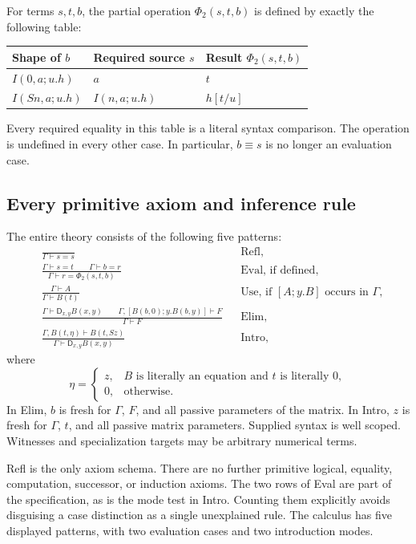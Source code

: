\documentclass[11pt]{article}
\theoremstyle{definition}\newtheorem{definition}[theorem]{Definition}
\newcommand{\D}{\mathsf D}
\begin{document}
For terms $s,t,b$, the partial operation $\Phi_2(s,t,b)$ is defined
by exactly the following table:
\begin{center}
\begin{tabular}{@{}lll@{}}
\toprule
Shape of $b$ & Required source $s$ & Result $\Phi_2(s,t,b)$\\
\midrule
$I(0,a;u.h)$ & $a$ & $t$\\
$I(Sn,a;u.h)$ & $I(n,a;u.h)$ & $h[t/u]$\\
\bottomrule
\end{tabular}
\end{center}
Every required equality in this table is a literal syntax comparison.
The operation is undefined in every other case. In particular,
$b\equiv s$ is no longer an evaluation case.

\subsection{Every primitive axiom and inference rule}

The entire theory consists of the following five patterns:
\begin{align}
 &\frac{}{\Gamma\vdash s=s}
       &&\text{Refl},\label{rule:refl}\\[3pt]
 &\frac{\Gamma\vdash s=t\qquad\Gamma\vdash b=r}
        {\Gamma\vdash r=\Phi_2(s,t,b)}
       &&\text{Eval, if defined},\label{rule:eval}\\[3pt]
 &\frac{\Gamma\vdash A}{\Gamma\vdash B(t)}
       &&\text{Use, if }[A;y.B]\text{ occurs in }\Gamma,\label{rule:use}\\[3pt]
 &\frac{\Gamma\vdash\D_{x,y}B(x,y)\qquad
         \Gamma,[B(b,0);y.B(b,y)]\vdash F}
        {\Gamma\vdash F}
       &&\text{Elim},\label{rule:elim}\\[3pt]
 &\frac{\Gamma,B(t,\eta)\vdash B(t,Sz)}
        {\Gamma\vdash\D_{x,y}B(x,y)}
       &&\text{Intro},\label{rule:intro}
\end{align}
where
\[
 \eta=\begin{cases}
 z,&\text{$B$ is literally an equation and $t$ is literally $0$},\\
 0,&\text{otherwise}.
 \end{cases}
\]
In Elim, $b$ is fresh for $\Gamma$, $F$, and all passive parameters
of the matrix. In Intro, $z$ is fresh for $\Gamma$, $t$, and all
passive matrix parameters. Supplied syntax is well scoped. Witnesses
and specialization targets may be arbitrary numerical terms.

Refl is the only axiom schema. There are no further primitive logical,
equality, computation, successor, or induction axioms. The two rows of
Eval are part of the specification, as is the mode test in Intro.
Counting them explicitly avoids disguising a case distinction as a
single unexplained rule. The calculus has five displayed patterns,
with two evaluation cases and two introduction modes.
\end{document}
